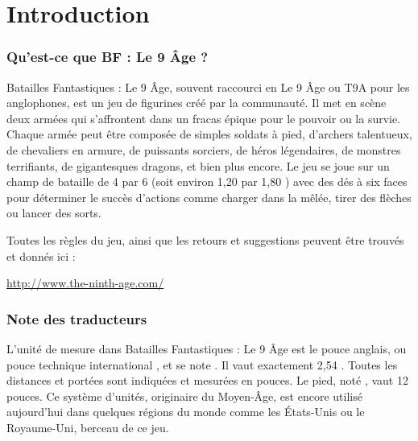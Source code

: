 
\part{Introduction}

\section{Qu'est-ce que BF : Le 9\ieme{} Âge ?}

Batailles Fantastiques : Le 9\ieme{} Âge, souvent raccourci en Le 9\ieme{} Âge ou T9A pour les anglophones, est un jeu de figurines créé par la communauté. Il met en scène deux armées qui s'affrontent dans un fracas épique pour le pouvoir ou la survie. Chaque armée peut être composée de simples soldats à pied, d'archers talentueux, de chevaliers en armure, de puissants sorciers, de héros légendaires, de monstres terrifiants, de gigantesques dragons, et bien plus encore. Le jeu se joue sur un champ de bataille de \unit{4}{\foot} par \unit{6}{\foot} (soit environ 1,20 {\meter} par 1,80 {\meter}) avec des dés à six faces pour déterminer le succès d'actions comme charger dans la mêlée, tirer des flèches ou lancer des sorts.

Toutes les règles du jeu, ainsi que les retours et suggestions peuvent être trouvés et donnés ici :

\begin{center}
\url{http://www.the-ninth-age.com/}
\end{center}


\newpage
\section{Note des traducteurs}

L'unité de mesure dans Batailles Fantastiques : Le 9\ieme{} Âge est le pouce anglais, ou \og pouce technique international \fg{}, et se note \inch{}. Il vaut exactement 2,54 {\centi\meter}. Toutes les distances et portées sont indiquées et mesurées en pouces. Le pied, noté \foot{}, vaut 12 pouces. Ce système d'unités, originaire du Moyen-Âge, est encore utilisé aujourd'hui dans quelques régions du monde comme les États-Unis ou le Royaume-Uni, berceau de ce jeu.

